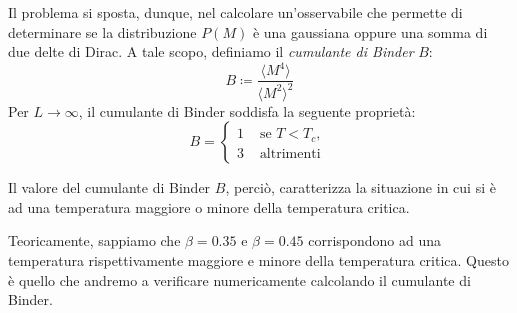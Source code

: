 \documentclass[10pt,a4paper]{article}
\begin{document}
 Il problema si sposta, dunque, nel calcolare un'osservabile che permette di determinare se la distribuzione $P(M)$ è una gaussiana oppure una somma di due delte di Dirac. A tale scopo, definiamo il \emph{cumulante di Binder} $B$:
\begin{equation}
	B\coloneqq\frac{\langle M^4\rangle}{\langle M^2\rangle ^2}
\end{equation}
Per $L\to\infty$, il cumulante di Binder soddisfa la seguente proprietà:
\begin{equation}\label{BinderTc}
B=
\begin{cases}
1 & \text{ se $T< T_c $,	} \\
3 & \text{ altrimenti}
\end{cases}
\end{equation}

Il valore del cumulante di Binder $B$, perciò, caratterizza la situazione in cui si è ad una temperatura maggiore o minore della temperatura critica.

Teoricamente, sappiamo che $\beta=0.35$ e $\beta=0.45$ corrispondono ad una temperatura rispettivamente maggiore e minore della temperatura critica. Questo è quello che andremo a verificare numericamente calcolando il cumulante di Binder.
\end{document}
